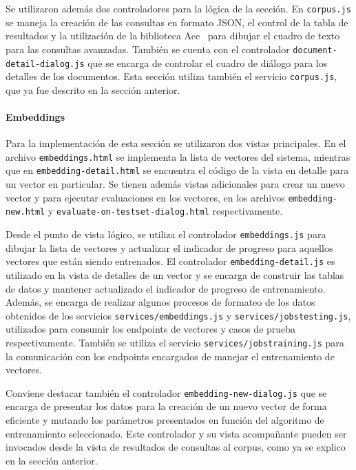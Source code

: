Se utilizaron además dos controladores para la lógica de la sección. En \texttt{corpus.js} se maneja la
creación de las consultas en formato JSON, el control de la tabla de resultados y la utilización de la
biblioteca Ace~\cite{AceJS} para dibujar el cuadro de texto para las consultas avanzadas. También se cuenta
con el controlador \texttt{document-detail-dialog.js} que se encarga de controlar el cuadro de diálogo
para los detalles de los documentos. Esta sección utiliza también el servicio \texttt{corpus.js}, que ya fue
descrito en la sección anterior.

\paragraph{Embeddings}

Para la implementación de esta sección se utilizaron dos vistas principales. En el archivo
\texttt{embeddings.html} se implementa la lista de vectores del sistema, mientras que en
\texttt{embedding-detail.html} se encuentra el código de la vista en detalle para un vector en particular.
Se tienen además vistas adicionales para crear un nuevo vector y para ejecutar evaluaciones en los vectores,
en los archivos \texttt{embedding-new.html} y \texttt{evaluate-on-testset-dialog.html} respectivamente.

Desde el punto de vista lógico, se utiliza el controlador \texttt{embeddings.js} para dibujar la lista de
vectores  y actualizar el indicador de progreso para aquellos vectores que están siendo entrenados. El
controlador \texttt{embedding-detail.js} es utilizado en la vista de detalles de un vector y se encarga de
construir las tablas de datos y mantener actualizado el indicador de progreso de entrenamiento. Además, se
encarga de realizar algunos procesos de formateo de los datos obtenidos de los servicios
\texttt{services/embeddings.js} y \texttt{services/jobstesting.js}, utilizados para consumir los endpoints
de vectores y casos de prueba respectivamente. También se utiliza el servicio
\texttt{services/jobstraining.js} para la comunicación con los endpoints encargados de manejar el
entrenamiento de vectores.

Conviene destacar también el controlador \texttt{embedding-new-dialog.js} que se encarga de presentar los
datos para la creación de un nuevo vector de forma eficiente y mutando los parámetros presentados en función
del algoritmo de entrenamiento seleccionado. Este controlador y su vista acompañante pueden ser invocados
desde la vista de resultados de consultas al corpus, como ya se explico en la sección anterior.

